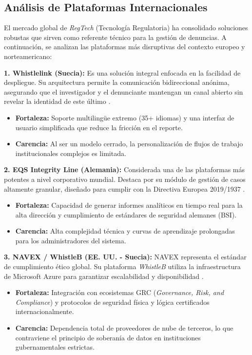 \subsection{Análisis de Plataformas Internacionales}

\begin{flushleft}
\justifying
El mercado global de \textit{RegTech} (Tecnología Regulatoria) ha consolidado soluciones robustas que sirven como referente técnico para la gestión de denuncias. A continuación, se analizan las plataformas más disruptivas del contexto europeo y norteamericano:

\textbf{1. Whistlelink (Suecia):}
Es una solución integral enfocada en la facilidad de despliegue. Su arquitectura permite la comunicación bidireccional anónima, asegurando que el investigador y el denunciante mantengan un canal abierto sin revelar la identidad de este último \cite{15}. 
\begin{itemize}
    \item \textbf{Fortaleza:} Soporte multilingüe extremo (35+ idiomas) y una interfaz de usuario simplificada que reduce la fricción en el reporte.
    \item \textbf{Carencia:} Al ser un modelo cerrado, la personalización de flujos de trabajo institucionales complejos es limitada.
\end{itemize}

\textbf{2. EQS Integrity Line (Alemania):}
Considerada una de las plataformas más potentes a nivel corporativo mundial. Destaca por su módulo de gestión de casos altamente granular, diseñado para cumplir con la Directiva Europea 2019/1937 \cite{16}.
\begin{itemize}
    \item \textbf{Fortaleza:} Capacidad de generar informes analíticos en tiempo real para la alta dirección y cumplimiento de estándares de seguridad alemanes (BSI).
    \item \textbf{Carencia:} Alta complejidad técnica y curvas de aprendizaje prolongadas para los administradores del sistema.
\end{itemize}

\textbf{3. NAVEX / WhistleB (EE. UU. - Suecia):}
NAVEX representa el estándar de cumplimiento ético global. Su plataforma \textit{WhistleB} utiliza la infraestructura de Microsoft Azure para garantizar escalabilidad y disponibilidad \cite{17}.
\begin{itemize}
    \item \textbf{Fortaleza:} Integración con ecosistemas GRC (\textit{Governance, Risk, and Compliance}) y protocolos de seguridad física y lógica certificados internacionalmente.
    \item \textbf{Carencia:} Dependencia total de proveedores de nube de terceros, lo que contraviene el principio de soberanía de datos en instituciones gubernamentales estrictas.
\end{itemize}


\end{flushleft}

